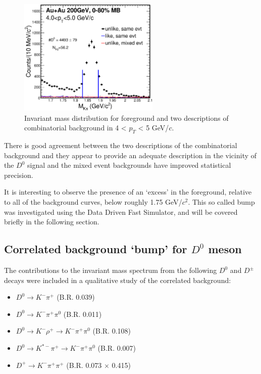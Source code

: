 \documentclass[a4paper]{article}
\begin{document}
\begin{figure}[htbp]
\centering
\includegraphics[keepaspectratio,width=0.6\textwidth]{fig/Mixed_cent_1_9_pt_4_5.eps}
\caption{Invariant mass distribution for foreground and two descriptions of combinatorial background in 4 < $p_T$ < 5 GeV/$c$.}
\label{fig:mixedEvent_pt4_5}
\end{figure}

There is good agreement between the two descriptions of the combinatorial background and they appear to provide an adequate description in the vicinity of the $D^0$ signal and the mixed event backgrounds have improved statistical precision.

It is interesting to observe the presence of an `excess' in the foreground, relative to all of the background curves, below roughly 1.75 GeV/$c^2$.  This so called bump was investigated using the Data Driven Fast Simulator, and will be covered briefly in the following section.

\subsection{Correlated background `bump' for $D^0$ meson}

The contributions to the invariant mass spectrum from the following $D^0$ and $D^\pm$ decays were included in a qualitative study of the correlated background: 

\begin{itemize}
\item $D^0 \rightarrow K^-\pi^+$ (B.R. 0.039)
\item $D^0 \rightarrow  K^-\pi^+\pi^0$ (B.R. 0.011)
\item $D^0 \rightarrow  K^-\rho^+ \rightarrow K^-\pi^+\pi^0$ (B.R. 0.108)
\item $D^0 \rightarrow  K^{*-}\pi^+\rightarrow K^-\pi^+\pi^0$ (B.R. 0.007)
\item $D^+ \rightarrow  K^-\pi^+\pi^+$ (B.R. 0.073 $\times$ 0.415)
\end{itemize}
\end{document}

